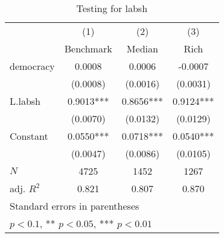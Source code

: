 \begin{table}[htbp]\centering
\def\sym#1{\ifmmode^{#1}\else\(^{#1}\)\fi}
\caption{Testing for labsh \label{tab:regression9}}
\begin{tabular}{l*{3}{c}}
\hline\hline
            &\multicolumn{1}{c}{(1)}&\multicolumn{1}{c}{(2)}&\multicolumn{1}{c}{(3)}\\
            &\multicolumn{1}{c}{Benchmark}&\multicolumn{1}{c}{Median}&\multicolumn{1}{c}{Rich}\\
\hline
democracy   &      0.0008   &      0.0006   &     -0.0007   \\
            &    (0.0008)   &    (0.0016)   &    (0.0031)   \\
[1em]
L.labsh     &      0.9013***&      0.8656***&      0.9124***\\
            &    (0.0070)   &    (0.0132)   &    (0.0129)   \\
[1em]
Constant    &      0.0550***&      0.0718***&      0.0540***\\
            &    (0.0047)   &    (0.0086)   &    (0.0105)   \\
\hline
\(N\)       &        4725   &        1452   &        1267   \\
adj. \(R^{2}\)&       0.821   &       0.807   &       0.870   \\
\hline\hline
\multicolumn{4}{l}{\footnotesize Standard errors in parentheses}\\
\multicolumn{4}{l}{\footnotesize * \(p<0.1\), ** \(p<0.05\), *** \(p<0.01\)}\\
\end{tabular}
\end{table}
